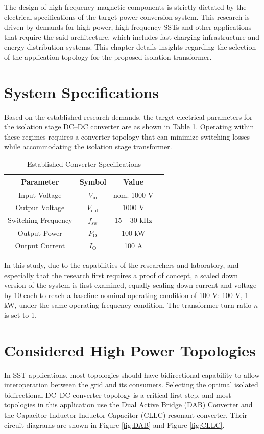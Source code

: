 The design of high-frequency magnetic components is strictly dictated by the electrical specifications of the target power conversion system. This research is driven by demands for high-power, high-frequency SSTs and other applications that require the said architecture, which includes fast-charging infrastructure and energy distribution systems. This chapter details insights regarding the selection of the application topology for the proposed isolation transformer.

\section{System Specifications}
Based on the established research demands, the target electrical parameters for the isolation stage DC--DC converter are as shown in Table \ref{tab:converter_specs}. Operating within these regimes requires a converter topology that can minimize switching losses while accommodating the isolation stage transformer.

\begin{table}[h!]
\centering
\caption{Established Converter Specifications}
\label{tab:converter_specs}
\begin{tabular}{cccc}
\hline
\textbf{Parameter} & \textbf{Symbol} & \textbf{Value} \\
\hline \hline
Input Voltage & $V_{\mathrm{in}}$ & nom. 1000 V \\ 
Output Voltage & $V_{\mathrm{out}}$ & 1000 V   \\
Switching Frequency & $f_{\mathrm{sw}}$ & 15 -- 30 kHz \\ 
Output Power & $P_\mathrm{O}$ & 100 kW \\
Output Current & $I_\mathrm{O}$ & 100 A \\
\hline
\end{tabular}
\end{table}

In this study, due to the capabilities of the researchers and laboratory, and especially that the research first requires a proof of concept, a scaled down version of the system is first examined, equally scaling down current and voltage by 10 each to reach a baseline nominal operating condition of 100 V: 100 V, 1 kW, under the same operating frequency condition. The transformer turn ratio $n$ is set to 1.

\section{Considered High Power Topologies}
In SST applications, most topologies should have bidirectional capability to allow interoperation between the grid and its consumers. Selecting the optimal isolated bidirectional DC--DC converter topology is a critical first step, and most topologies in this application use the Dual Active Bridge (DAB) Converter and the Capacitor-Inductor-Inductor-Capacitor (CLLC) resonant converter. Their circuit diagrams are shown in Figure \ref{fig:DAB} and Figure \ref{fig:CLLC}. 

